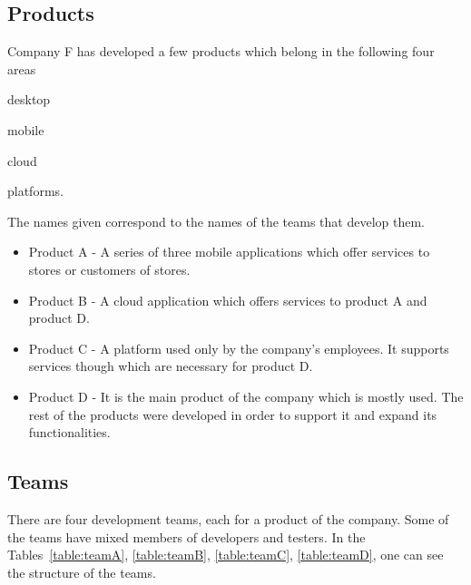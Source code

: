\subsection{Products}
Company F has developed a few products which belong in the following four areas 
\begin{inparaenum} [a\upshape)]
\item desktop
\item mobile
\item cloud
\item platforms.
\end{inparaenum}
The names given correspond to the names of the teams that develop them.

\begin{itemize}
\item Product A - A series of three mobile applications which offer services to stores or customers of stores.
\item Product B - A cloud application which offers services to product A and product D.
\item Product C - A platform used only by the company's employees. It supports services though which are necessary for product D.
\item Product D - It is the main product of the company which is mostly used. The rest of the products were developed in order to support it and expand its functionalities.

\end{itemize}

\subsection{Teams}
There are four development teams, each for a product of the company. Some of the teams have mixed members of developers and testers. In the Tables~\ref{table:teamA}, \ref{table:teamB}, \ref{table:teamC}, \ref{table:teamD}, one can see the structure of the teams. \\

